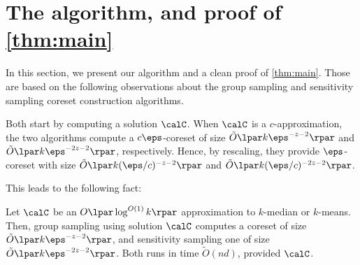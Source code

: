 \section{The algorithm, and proof of \cref{thm:main}}

In this section, we present our algorithm and a clean proof of \cref{thm:main}. Those are based on the following observations about the group
sampling \cite{stoc21} and sensitivity sampling \cite{FeldmanL11} coreset construction algorithms.

Both start by computing a solution $\calC$. When $\calC$ is a $c$-approximation, the two algorithms compute a $c \eps$-coreset of size $\tilde O\lpar
k \eps^{-z-2}\rpar$ and $\tilde O\lpar k \eps^{-2z -2}\rpar$, respectively. Hence, by rescaling, they provide $\eps$-coreset with size $\tilde O\lpar
k (\eps/c)^{-z-2}\rpar$ and $\tilde O\lpar k (\eps/c)^{-2z-2}\rpar$. 

This leads to the following fact:
\begin{fact}\label{fact:logApprox}
Let $\calC$ be an $O\lpar \log^{O(1)} k\rpar$ approximation to $k$-median or $k$-means.
Then, group sampling using solution $\calC$ computes a coreset of size $\tilde O\lpar
k \eps^{-z-2}\rpar$, and sensitivity sampling one of size $\tilde O\lpar k \eps^{-2z-2}\rpar$. 
Both runs in time $\tilde O(nd)$, provided $\calC$.
\end{fact}

%

